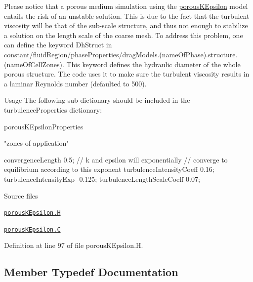 \label{_Description}%
 Please notice that a porous medium simulation using the \hyperlink{classFoam_1_1RASModels_1_1porousKEpsilon}{porous\+K\+Epsilon} model entails the risk of an unstable solution. This is due to the fact that the turbulent viscosity will be that of the sub-\/scale structure, and thus not enough to stabilize a solution on the length scale of the coarse mesh. To address this problem, one can define the keyword Dh\+Struct in constant/fluid\+Region/phase\+Properties/drag\+Models.(name\+Of\+Phase).structure. (name\+Of\+Cell\+Zones). This keyword defines the hydraulic diameter of the whole porous structure. The code uses it to make sure the turbulent viscosity results in a laminar Reynolds number (defaulted to 500).

\begin{DoxyParagraph}{Usage}
The following sub-\/dictionary should be included in the turbulence\+Properties dictionary\+: \begin{DoxyVerb}porousKEpsilonProperties
{
    "zones of application"
    {
    
        convergenceLength           0.5; // k and epsilon will exponentially 
                     // converge to equilibrium according to this exponent
        turbulenceIntensityCoeff    0.16; 
        turbulenceIntensityExp      -0.125;
        turbulenceLengthScaleCoeff  0.07;
    }
}
\end{DoxyVerb}

\end{DoxyParagraph}
\begin{DoxyParagraph}{Source files}

\begin{DoxyItemize}
\item \href{../../../home/carlo/data/GeN-Foam/GeN-Foam_ffn/GeN-Foam/GeN-Foam/classes/thermalHydraulics/src/physicsModels/turbulenceModels/porousKEpsilon/porousKEpsilon.H}{\tt porous\+K\+Epsilon.\+H} 
\item \href{../../../home/carlo/data/GeN-Foam/GeN-Foam_ffn/GeN-Foam/GeN-Foam/classes/thermalHydraulics/src/physicsModels/turbulenceModels/porousKEpsilon/porousKEpsilon.C}{\tt porous\+K\+Epsilon.\+C} 
\end{DoxyItemize}
\end{DoxyParagraph}


Definition at line 97 of file porous\+K\+Epsilon.\+H.



\subsection{Member Typedef Documentation}
\mbox{\label{classFoam_1_1RASModels_1_1porousKEpsilon_a06a66094f33d6817d19225445c5ea874}} 

